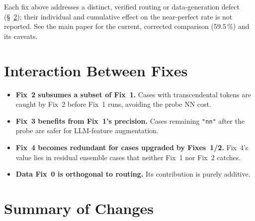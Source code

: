 \documentclass[twoside,11pt]{article}
\begin{document}
Each fix above addresses a distinct, verified routing or data-generation defect
(\S~\ref{sec:changes}); their individual and cumulative effect on the near-perfect rate
is not reported. See the main paper for the current, corrected comparison (59.5\,\%) and
its caveats.


\section{Interaction Between Fixes}
\label{sec:interactions}

\begin{itemize}[leftmargin=*]
  \item \textbf{Fix~2 subsumes a subset of Fix~1.}  Cases with transcendental
    tokens are caught by Fix~2 before Fix~1 runs, avoiding the probe NN cost.
  \item \textbf{Fix~3 benefits from Fix~1's precision.}  Cases remaining
    \texttt{"nn"} after the probe are safer for LLM-feature augmentation.
  \item \textbf{Fix~4 becomes redundant for cases upgraded by Fixes~1/2.}
    Fix~4's value lies in residual ensemble cases that neither Fix~1 nor
    Fix~2 catches.
  \item \textbf{Data Fix~0 is orthogonal to routing.}  Its contribution
    is purely additive.
\end{itemize}

\section{Summary of Changes}
\label{sec:changes}
\end{document}
